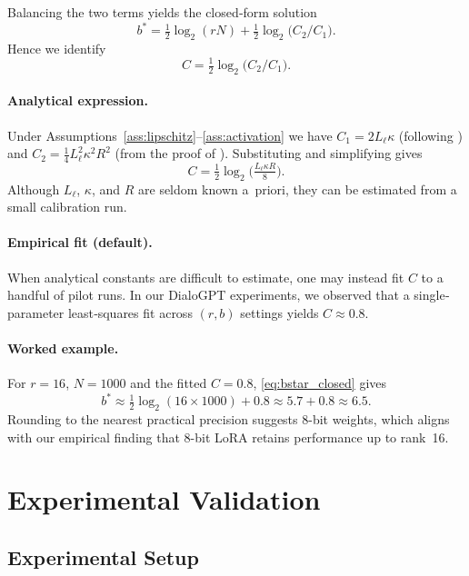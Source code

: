 \documentclass[10pt,twocolumn]{article}
\begin{document}
Balancing the two terms yields the closed‐form solution
\begin{equation}
\label{eq:bstar_closed}
 b^* = \tfrac12 \log_2\!\left( rN \right) + \tfrac12 \log_2\!\bigl( C_2/C_1 \bigr).
\end{equation}
Hence we identify
\begin{equation}
 C = \tfrac12 \log_2\!\bigl( C_2/C_1 \bigr).
\end{equation}

\paragraph{Analytical expression.}  Under Assumptions~\ref{ass:lipschitz}--\ref{ass:activation} we have $C_1 = 2 L_{\ell} \kappa$ (following \citealp{malladi2023kernel}) and $C_2 = \tfrac{1}{4} L_{\ell}^2 \kappa^2 R^2$ (from the proof of ).  Substituting and simplifying gives
\begin{equation}
 C = \tfrac12 \log_2\!\bigl( \tfrac{L_{\ell} \kappa R}{8} \bigr).
\end{equation}
Although $L_{\ell}$, $\kappa$, and $R$ are seldom known a~priori, they can be estimated from a small calibration run.

\paragraph{Empirical fit (default).}  When analytical constants are difficult to estimate, one may instead fit $C$ to a handful of pilot runs.  In our DialoGPT experiments, we observed that a single‐parameter least‐squares fit across $(r,b)$ settings yields $C \approx 0.8$.

\paragraph{Worked example.}  For $r=16$, $N=1000$ and the fitted $C\!=\!0.8$, \eqref{eq:bstar_closed} gives
\[
 b^* \approx \tfrac12\log_2(16{\times}1000) + 0.8 \approx 5.7 + 0.8 \approx 6.5.
\]
Rounding to the nearest practical precision suggests 8-bit weights, which aligns with our empirical finding that 8-bit LoRA retains performance up to rank~16.

\section{Experimental Validation}

\subsection{Experimental Setup}
\end{document}
